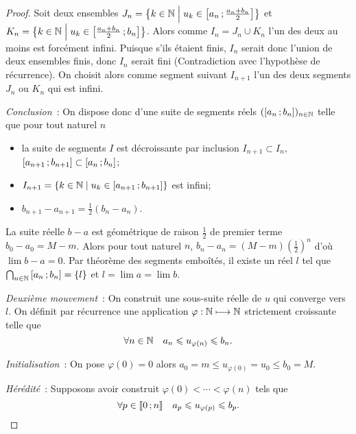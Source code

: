 \begin{proof}
    Soit deux ensembles \(J_n = \left\{k \in \mathbb{N}\mathrel{}\middle|\mathrel{}u_k \in
    \left[ a_n \, ; {} \frac{a_n+b_n}{2} \right]\right\}\) et \(K_n = \left\{k \in \mathbb{N}\mathrel{}\middle|\mathrel{}u_k \in
    \left[ \frac{a_n+b_n}{2} \, ; {} b_n \right]\right\}\). Alors comme \(I_n = J_n \cup K_n\)
    l'un des deux au moins est forcément infini. Puisque s'ils étaient finis,
    \(I_n\) serait donc l'union de deux ensembles finis, donc \(I_n\) serait fini
    (Contradiction avec l'hypothèse de récurrence). On choisit alors comme segment
    suivant \(I_{n+1}\) l'un des deux segments \(J_n\) ou \(K_n\) qui est infini.

    \emph{Conclusion}~: On dispose donc d'une suite de segments réels
    \((\left[ a_n \, ; {} b_n \right])_{n \in \mathbb{N}}\) telle que pour tout naturel \(n\)
    \begin{itemize}
        \item la suite de segments \(I\) est décroissante par inclusion \(I_{n+1}
            \subset I_n\), \(\left[ a_{n+1} \, ; {} b_{n+1} \right] \subset
            \left[ a_{n} \, ; {} b_{n} \right]\);
        \item \(I_{n+1} = \left\{k \in \mathbb{N}\mathrel{}\middle|\mathrel{}u_k \in
            \left[ a_{n+1} \, ; {} b_{n+1} \right]\right\}\) est infini;
        \item \(b_{n+1}-a_{n+1} = \frac{1}{2}(b_n-a_n)\).
    \end{itemize}

    La suite réelle \(b-a\) est géométrique de raison \(\frac{1}{2}\) de premier
    terme \(b_0-a_0 = M-m\). Alors pour tout naturel \(n\), \(b_n-a_n = (M-m)
    \left(\frac{1}{2}\right)^n\) d'où \(\lim b-a = 0\). Par théorème des segments
    emboîtés, il existe un réel \(l\) tel que \(\bigcap_{n \in \mathbb{N}}
    \left[ a_{n} \, ; {} b_{n} \right] = \{l\}\) et \(l = \lim a = \lim b\).


    \emph{Deuxième mouvement}~: On construit une sous-suite réelle de \(u\) qui
    converge vers \(l\). On définit par récurrence une application \(\varphi : \mathbb{N}
    \longmapsto \mathbb{N}\) strictement croissante telle que
    \begin{equation}
        \forall n \in \mathbb{N} \quad a_n \leqslant u_{\varphi(n)} \leqslant b_n.
    \end{equation}

    \emph{Initialisation}~: On pose \(\varphi(0) = 0\) alors \(a_0 = m \leqslant
    u_{\varphi(0)} = u_{0} \leqslant b_0 = M\).

    \emph{Hérédité}~: Supposons avoir construit
    \(\varphi(0) < \cdots < \varphi(n)\) tels que
    \begin{equation}
        \forall p \in \mathopen{\llbracket}0\mathclose{}\mathpunct{};n\mathclose{\rrbracket} \quad a_p \leqslant u_{\varphi(p)}
        \leqslant b_p.
    \end{equation}


\end{proof}
